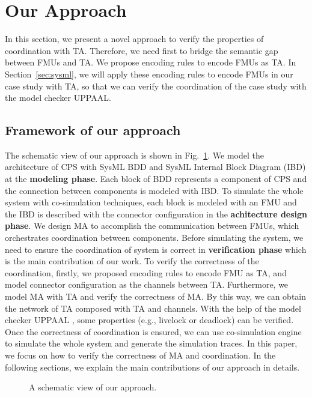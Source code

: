 \section{Our Approach}
In this section, we present a novel approach to verify the properties of coordination with TA. Therefore, we need first to bridge the semantic gap between FMUs and TA. We propose encoding rules to encode FMUs as TA. In Section~\ref{sec:sysml}, we will apply these encoding rules to encode FMUs in our case study with TA, so that we can verify the coordination of the case study with the model checker UPPAAL.
\label{sec:encoding}
\subsection{Framework of our approach}
The schematic view of our approach is shown in Fig.~\ref{paper-arc}. We model the architecture of CPS with SysML BDD and SysML Internal Block Diagram (IBD) at the \textbf{modeling phase}. Each block of BDD represents a component of CPS and the connection between components is modeled with IBD. To simulate the whole system with co-simulation techniques, each block is modeled with an FMU and the IBD is described with the connector configuration in the \textbf{achitecture design phase}. We design MA to accomplish the communication between FMUs, which orchestrates coordination between components. Before simulating the system, we need to ensure the coordination of system is correct in \textbf{verification phase} which is the main contribution of our work. To verify the correctness of the coordination, firstly, we proposed encoding rules to encode FMU as TA, and model connector configuration as the channels between TA. Furthermore, we model MA with TA and verify the correctness of MA. By this way, we can obtain the network of TA composed with TA and channels. With the help of the model checker UPPAAL \cite{BehrmannDLHPYH06}, some properties (e.g., livelock or deadlock) can be verified. Once the correctness of coordination is ensured, we can use co-simulation engine to simulate the whole system and generate the simulation traces. In this paper, we focus on how to verify the correctness of MA and coordination. In the following sections, we explain the main contributions of our approach in details.
\begin{figure}[htbp]
	\caption{A schematic view of our approach.}
	\label{paper-arc}
\end{figure}

